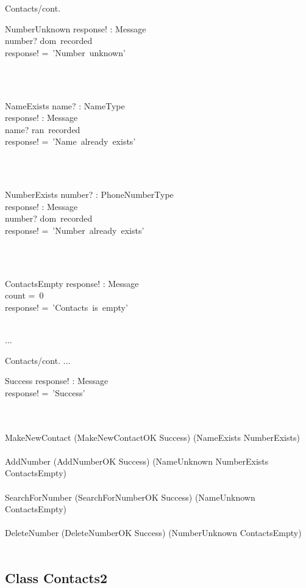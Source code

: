 \documentclass[12pt]{article}
\begin{document}
\begin{spacing}{1.5}
\begin{class}{Contacts/cont.}
\begin{op}{NumberUnknown}
response! : Message\\
\ST
number? \notin dom~recorded\\
response! =~'Number~unknown'
\end{op}\\
\\
\begin{op}{NameExists}
name? : NameType\\
response! : Message\\
\ST
name? \in ran~recorded\\
response! =~'Name~already~exists'
\end{op}\\
\\
\begin{op}{NumberExists}
number? : PhoneNumberType\\
response! : Message\\
\ST
number? \in dom~recorded\\
response! =~'Number~already~exists'
\end{op}\\
\\
\begin{op}{ContactsEmpty}
response! : Message\\
\ST
count =~0\\
response! =~'Contacts~is~empty'
\end{op}\\
...
\end{class}
\newpage
\begin{class}{Contacts/cont.}
...
\also
\begin{op}{Success}
response! : Message\\
\ST
response! =~'Success'
\end{op}\\
\mbox{}\\
MakeNewContact \sdef (MakeNewContactOK \land Success) \oplus (NameExists \lor NumberExists)  \\
\mbox{}\\
AddNumber \sdef (AddNumberOK \land Success) \oplus (NameUnknown \lor NumberExists \lor ContactsEmpty)  \\
\mbox{}\\
SearchForNumber \sdef (SearchForNumberOK \land Success) \oplus (NameUnknown \lor ContactsEmpty)  \\
\mbox{}\\
DeleteNumber \sdef (DeleteNumberOK \land Success) \oplus (NumberUnknown \lor ContactsEmpty)  \\
\mbox{}\\
\end{class}
\newpage
\subsection{Class Contacts2}


\end{spacing}
\end{document}
